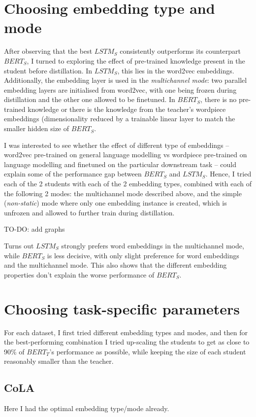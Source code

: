 \documentclass[bsc,frontabs,twoside,singlespacing,parskip,deptreport]{infthesis}
\begin{document}
{  \section{Choosing embedding type and mode}{
    After observing that the best $LSTM_S$ consistently outperforms its counterpart $BERT_S$, I turned to exploring the effect of pre-trained knowledge present in the student before distillation.
    In $LSTM_S$, this lies in the word2vec embeddings. Additionally, the embedding layer is used in the \textit{multichannel mode}: two parallel embedding layers are initialised from word2vec, with one being frozen during distillation and the other one allowed to be finetuned. In $BERT_S$, there is no pre-trained knowledge or there is the knowledge from the teacher's wordpiece embeddings (dimensionality reduced by a trainable linear layer to match the smaller hidden size of $BERT_S$.

    I was interested to see whether the effect of different type of embeddings -- word2vec pre-trained on general language modelling vs wordpiece pre-trained on language modelling and finetuned on the particular downstream task -- could explain some of the performance gap between $BERT_S$ and $LSTM_S$.
    Hence, I tried each of the 2 students with each of the 2 embedding types, combined with each of the following 2 modes: the multichannel mode described above, and the simple (\textit{non-static}) mode where only one embedding instance is created, which is unfrozen and allowed to further train during distillation.

    TO-DO: add graphs

    Turns out $LSTM_S$ strongly prefers word embeddings in the multichannel mode, while $BERT_S$ is less decisive, with only slight preference for word embeddings and the multichannel mode. This also shows that the different embedding properties don't explain the worse performance of $BERT_S$.
  }

  \section{Choosing task-specific parameters}{
    For each dataset, I first tried different embedding types and modes, and then for the best-performing combination I tried up-scaling the students to get as close to 90\% of $BERT_T$'s performance as possible, while keeping the size of each student reasonably smaller than the teacher.

    \subsection{CoLA}{
      Here I had the optimal embedding type/mode already.

}}}
\end{document}
